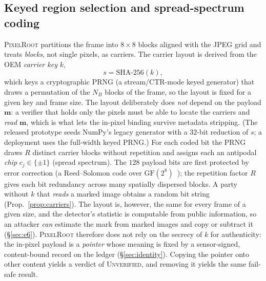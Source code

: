 \documentclass[journal]{IEEEtran}
\newcommand{\pr}{\textup{\textsc{PixelRoot}}}
\begin{document}
\subsection{Keyed region selection and spread-spectrum coding}\label{sec:select}
\pr{} partitions the frame into $8\!\times\!8$ blocks aligned with the JPEG grid
and treats \emph{blocks}, not single pixels, as carriers. The carrier layout is
derived from the OEM \emph{carrier key} $k$,
\begin{equation}
s = \mathrm{SHA\text{-}256}(k),
\end{equation}
which keys a cryptographic PRNG (a stream/CTR-mode keyed generator) that draws a
permutation of the $N_B$ blocks of the frame, so the layout is fixed for a given
key and frame size. The layout
deliberately does \emph{not} depend on the payload $\mathbf{m}$: a verifier that
holds only the pixels must be able to locate the carriers and \emph{read}
$\mathbf{m}$, which is what lets the in-pixel binding survive metadata
stripping. (The released prototype seeds NumPy's legacy generator with a $32$-bit
reduction of $s$; a deployment uses the full-width keyed PRNG.) For each coded
bit the PRNG draws $R$ distinct carrier blocks without repetition and assigns
each an antipodal \emph{chip} $c_j\!\in\!\{\pm1\}$ (spread spectrum). The $128$
payload bits are first protected by error correction (a Reed--Solomon code over
$\mathrm{GF}(2^8)$~\cite{reed1960polynomial}); the repetition factor $R$ gives each bit redundancy across
many spatially dispersed blocks. A party without $k$ that \emph{reads} a marked
image obtains a random bit string (Prop.~\ref{prop:carriers}). The layout is,
however, the same for every frame of a given size, and the detector's
statistic is computable from public information, so an attacker \emph{can}
estimate the mark from marked images and copy or subtract it (\S\ref{sec:e6}).
\pr{} therefore does not rely on the secrecy of $k$ for authenticity: the
in-pixel payload is a \emph{pointer} whose meaning is fixed by a sensor-signed,
content-bound record on the ledger (\S\ref{sec:identity}). Copying the pointer
onto other content yields a verdict of \textsc{Unverified}, and removing it yields
the same fail-safe result.
\end{document}
